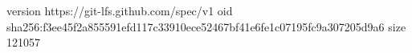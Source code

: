 version https://git-lfs.github.com/spec/v1
oid sha256:f3ee45f2a855591efd117c33910ece52467bf41e6fe1c07195fc9a307205d9a6
size 121057
